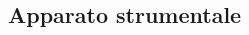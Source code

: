 \documentclass[10pt,oneside,a4paper]{article}
\newenvironment{Figure}
  {\par\medskip\noindent\minipage{\linewidth}}
  {\endminipage\par\medskip}
\begin{document}
\begin{multicols}{2}
\section{Apparato strumentale}


%
%
%





\end{multicols}
\end{document}
